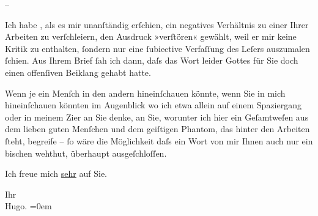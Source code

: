 \pstart
           \numberlinefalse{}–\numberlinetrue{}\pend
           
\pstart
           Ich habe \label{K_L01789-1v}\label{K_L01789-1}, als es mir unanſtändig erſchien, ein negatives Verhältnis zu einer Ihrer Arbeiten zu verſchleiern, den
               Ausdruck »verſtören« gewählt, weil er mir keine Kritik zu enthalten, ſondern nur eine
               ſubiective Verfaſſung des Leſers auszumalen ſchien. Aus Ihrem Brief ſah ich dann,
               daſs das Wort leider Gottes für Sie doch einen offenſiven {\pb}Beiklang gehabt hatte.\pend
           
\pstart
           Wenn je ein Menſch in den andern hineinſchauen könnte, wenn Sie in mich hineinſchauen
               könnten im Augenblick wo ich etwa allein auf einem Spaziergang oder in meinem Zi{\geminationm}er an Sie denke, an Sie, worunter ich hier ein
               Geſamtweſen aus dem lieben guten Menſchen und dem geiſtigen Phantom, das hinter den
               Arbeiten ſteht, begreife – ſo wäre die Möglichkeit daſs ein Wort von mir Ihnen auch
               nur ein bischen wehthut, überhaupt ausgeſchloſſen.\pend
           
\pstart
           Ich freue mich \uline{sehr} auf Sie.\pend
           
\pstart
           Ihr{\\[\baselineskip]}\spacefill\mbox{Hugo.}\pend
           \leftskip=0em{}\endnumbering{}  
      
